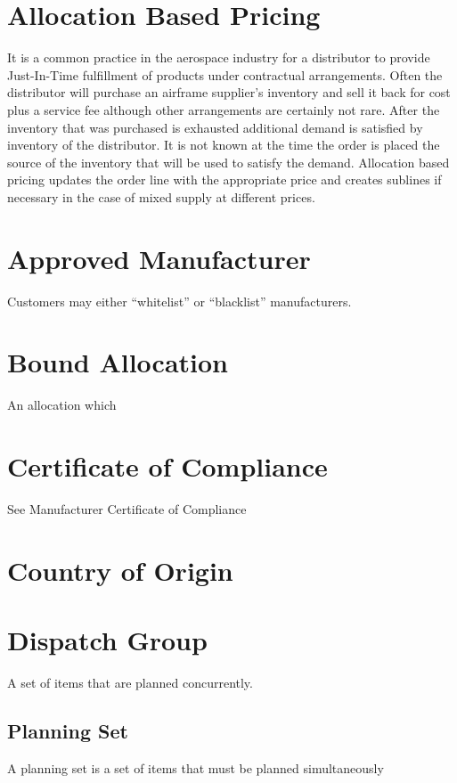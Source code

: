 \documentclass[letterpaper,10pt,english]{sphinxmanual}
\begin{document}
\section{Allocation Based Pricing}
\label{APS/Glossary:allocation-based-pricing}
It is a common practice in the aerospace industry for a distributor to
provide Just-In-Time fulfillment of products under contractual
arrangements. Often the distributor will purchase an airframe supplier’s
inventory and sell it back for cost plus a service fee although other
arrangements are certainly not rare. After the inventory that was
purchased is exhausted additional demand is satisfied by inventory of
the distributor. It is not known at the time the order is placed the
source of the inventory that will be used to satisfy the demand.
Allocation based pricing updates the order line with the appropriate
price and creates sublines if necessary in the case of mixed supply at
different prices.


\section{Approved Manufacturer}
\label{APS/Glossary:approved-manufacturer}
Customers may either ``whitelist'' or ``blacklist'' manufacturers.


\section{Bound Allocation}
\label{APS/Glossary:bound-allocation}
An allocation which


\section{Certificate of Compliance}
\label{APS/Glossary:certificate-of-compliance}
See Manufacturer Certificate of Compliance


\section{Country of Origin}
\label{APS/Glossary:country-of-origin}

\section{Dispatch Group}
\label{APS/Glossary:dispatch-group}
A set of items that are planned concurrently.


\subsection{Planning Set}
\label{APS/Glossary:planning-set}
A planning set is a set of items that must be planned simultaneously
\end{document}
